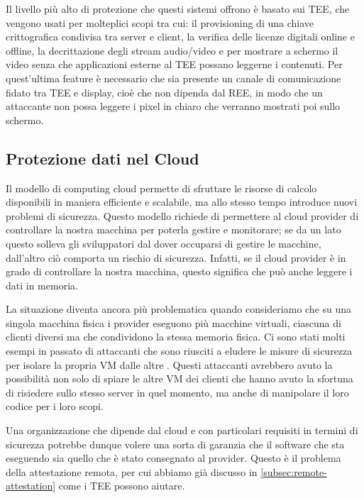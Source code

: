 \documentclass[12pt,italian]{report}
\begin{document}
Il livello più alto di protezione che questi sistemi offrono è basato sui TEE,
che vengono usati per molteplici scopi tra cui: il provisioning di una chiave
crittografica condivisa tra server e client, la verifica delle licenze digitali
online e offline, la decrittazione degli stream audio/video e per mostrare
a schermo il video senza che applicazioni esterne al TEE possano leggerne
i contenuti.
Per quest'ultima feature è necessario che sia presente un canale di
comunicazione fidato tra TEE e display, cioè che non dipenda dal REE, in modo
che un attaccante non possa leggere i pixel in chiaro che verranno mostrati poi
sullo schermo.

\subsection{Protezione dati nel Cloud}
\label{subsec:protezione-dati-cloud}
Il modello di computing cloud permette di sfruttare le risorse di calcolo
disponibili in maniera efficiente e scalabile, ma allo stesso tempo introduce
nuovi problemi di sicurezza.
Questo modello richiede di permettere al cloud provider di controllare la
nostra macchina per poterla gestire e monitorare; se da un lato questo solleva
gli sviluppatori dal dover occuparsi di gestire le macchine, dall'altro ciò
comporta un rischio di sicurezza.
Infatti, se il cloud provider è in grado di controllare la nostra macchina,
questo significa che può anche leggere i dati in memoria.

La situazione diventa ancora più problematica quando consideriamo che su
una singola macchina fisica i provider eseguono più macchine virtuali, ciascuna
di clienti diversi ma che condividono la stessa memoria fisica.
Ci sono stati molti esempi in passato di attaccanti che sono riusciti a eludere
le misure di sicurezza per isolare la propria VM dalle altre
\cite{vmescape1}\cite{vmescape2}\cite{vmescape3}.
Questi attaccanti avrebbero avuto la possibilità non solo di spiare le altre
VM dei clienti che hanno avuto la sfortuna di risiedere sullo stesso server in
quel momento, ma anche di manipolare il loro codice per i loro scopi.

Una organizzazione che dipende dal cloud e con particolari requisiti in
termini di sicurezza potrebbe dunque volere una sorta di garanzia che il
software che sta eseguendo sia quello che è stato consegnato al provider.
Questo è il problema della attestazione remota, per cui abbiamo già discusso
in \ref{subsec:remote-attestation} come i TEE possono aiutare.
\end{document}
